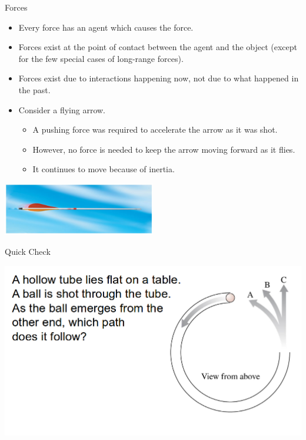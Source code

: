 \documentclass{beamer}
\newcommand{\red}[1]{{\color{red}{#1}}}
\newcommand{\checkL}[2]{\begin{textblock*}{1cm}(#1,#2){\Large \red{\Checkmark}}\end{textblock*}}
\begin{document}
\begin{frame}{Forces}
\begin{itemize}
   \item Every force has an agent which causes the force.
   \item Forces exist at the point of contact between the agent and the object (except for the few special cases of long-range forces).
   \item Forces exist due to interactions happening now, not due to what happened in the past.
   \item Consider a flying arrow.
   \begin{itemize}
      \item A pushing force was required to accelerate the arrow as it was shot.
      \item However, no force is needed to keep the arrow moving forward as it flies.
      \item It continues to move because of inertia.
   \end{itemize}
\end{itemize}
\begin{center}
   \includegraphics[width=0.5\textwidth]{../figures/05_Pg123_UnFigure.jpg}
\end{center}
\end{frame}

\begin{frame}{Quick Check}
\begin{center}
   \includegraphics[width=\textwidth]{../figures/QC5_10.png}
\end{center}
\only<2>{\checkL{11.2cm}{2.0cm}}
\end{frame}
\end{document}
